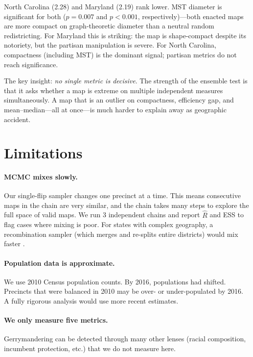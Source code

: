 \documentclass[11pt]{article}
\begin{document}
North Carolina (2.28) and Maryland (2.19) rank lower. MST diameter is
significant for both ($p = 0.007$ and $p < 0.001$, respectively)---both
enacted maps are more compact on graph-theoretic diameter than a neutral
random redistricting. For Maryland this is striking: the map is
shape-compact despite its notoriety, but the partisan manipulation is
severe. For North Carolina, compactness (including MST) is the dominant
signal; partisan metrics do not reach significance.

The key insight: \emph{no single metric is decisive}. The strength of
the ensemble test is that it asks whether a map is extreme on multiple
independent measures simultaneously. A map that is an outlier on
compactness, efficiency gap, and mean--median---all at once---is much
harder to explain away as geographic accident.

\section{Limitations}
\label{sec:limits}

\paragraph{MCMC mixes slowly.}
Our single-flip sampler changes one precinct at a time. This means
consecutive maps in the chain are very similar, and the chain takes
many steps to explore the full space of valid maps. We run 3
independent chains and report $\hat{R}$ and ESS to flag cases where
mixing is poor. For states with complex geography, a recombination
sampler (which merges and re-splits entire districts) would mix faster
\cite{deford2021}.

\paragraph{Population data is approximate.}
We use 2010 Census population counts. By 2016, populations had shifted.
Precincts that were balanced in 2010 may be over- or under-populated
by 2016. A fully rigorous analysis would use more recent estimates.

\paragraph{We only measure five metrics.}
Gerrymandering can be detected through many other lenses (racial
composition, incumbent protection, etc.) that we do not measure here.
\end{document}
